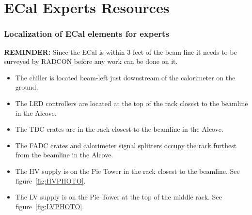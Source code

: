 \documentclass[12pt]{article}
\begin{document}
\newpage

\part{ECal Experts Resources}

   \section{Localization of ECal elements for experts}

{\bf REMINDER:} Since the ECal is within 3 feet of the beam line it needs to be surveyed by RADCON before any work can be done on it.
   {\footnotesize
\begin{itemize}
\item
The chiller is located beam-left just downstream of the calorimeter on the ground.
\item
The LED controllers are located at the top of the rack closest to the beamline in the Alcove.
\item
The TDC crates are in the rack closest to the beamline in the Alcove.
\item
The FADC crates and calorimeter signal splitters occupy the rack furthest from the beamline in the Alcove.
\item
    The HV supply is on the Pie Tower in the rack closest to the beamline.  See figure~\ref{fig:HVPHOTO}.
\item
    The LV supply is on the Pie Tower at the top of the middle rack. See figure~\ref{fig:LVPHOTO}.
\end{itemize}

}
\end{document}
